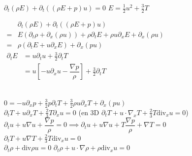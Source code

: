 \documentclass[12pt,a4paper]{article}
\begin{document}
$\partial_t (\rho E) + \partial_t\left((\rho E + p)u\right) = 0$ \hspace{1cm} $E = \frac12 u^2 +\frac32 T$ \\
	
\begin{minipage}{9cm}
	$\begin{aligned}
	&\partial_t (\rho E) + \partial_t\left((\rho E + p)u\right)\\
	=&E(\partial_t\rho + \partial_x (\rho u))+\rho\partial_t E + \rho u\partial_x E + \partial_x(\rho u) \\
	=&\rho\left(\partial_t E + u \partial_x E\right) + \partial_x (pu) 
\end{aligned}$\\

$\begin{aligned}
	\partial_t E &= u\partial_t u + \frac32 \partial_t T\\
	&= u\left[-u\partial_x u - \dfrac{\nabla p}\rho\right] + \frac32 \partial_t T
\end{aligned}$
\end{minipage}\begin{minipage}{15cm}
\end{minipage}\\

\noindent$0 = -u\partial_x p + \frac32 p \partial_t T + \frac32 \rho u \partial_x T + \partial_x (pu) $\\
$\partial_t T + u \partial_x T + \frac23 T\partial_x u = 0$ \hspace{3cm} (en 3D $\partial_t T + u\cdot\nabla_x T + \frac23 T \mathrm{div}_x u = 0$)\\

$\partial_t u + u\nabla u + \dfrac{\nabla p}\rho = 0 \implies \partial_t u + u \nabla u + T\dfrac{\nabla p}\rho + \nabla T = 0$\\
$\partial_t T + u\nabla T + \frac23 T \mathrm{div}_x u = 0$\\
$\partial_t\rho+\mathrm{div}\rho u = 0$ \hspace{1cm} $\partial_t \rho + u \cdot \nabla \rho + \rho \mathrm{div}_x u = 0$
\end{document}
